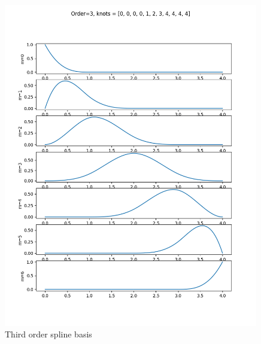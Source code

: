 \documentclass{article}
\begin{document}
\begin{figure}[hbt]
  \centering\includegraphics[width=0.99\textwidth]{./figures/spline_basis_3}
  \caption{Third order spline basis}
  \label{fig:spline_basis_3}  
\end{figure}
\end{document}
